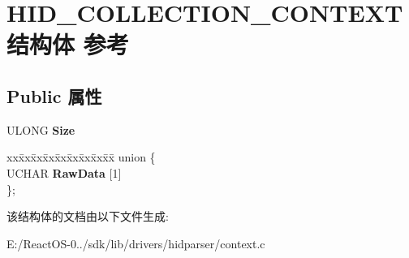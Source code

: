 \hypertarget{struct_h_i_d___c_o_l_l_e_c_t_i_o_n___c_o_n_t_e_x_t}{}\section{H\+I\+D\+\_\+\+C\+O\+L\+L\+E\+C\+T\+I\+O\+N\+\_\+\+C\+O\+N\+T\+E\+X\+T结构体 参考}
\label{struct_h_i_d___c_o_l_l_e_c_t_i_o_n___c_o_n_t_e_x_t}
\subsection*{Public 属性}
\begin{DoxyCompactItemize}
\item 
\mbox{\label{struct_h_i_d___c_o_l_l_e_c_t_i_o_n___c_o_n_t_e_x_t_a4e373f0a308ee4147535ea0e18e33dd9}} 
U\+L\+O\+NG {\bfseries Size}
\item 
\mbox{\label{struct_h_i_d___c_o_l_l_e_c_t_i_o_n___c_o_n_t_e_x_t_ad73fb507b31e554948b68467adbc8106}} 
\begin{tabbing}
xx\=xx\=xx\=xx\=xx\=xx\=xx\=xx\=xx\=\kill
union \{\\
\>UCHAR {\bfseries RawData} \mbox{[}1\mbox{]}\\
\}; \\

\end{tabbing}\end{DoxyCompactItemize}


该结构体的文档由以下文件生成\+:\begin{DoxyCompactItemize}
\item 
E\+:/\+React\+O\+S-\/0../sdk/lib/drivers/hidparser/context.\+c\end{DoxyCompactItemize}
